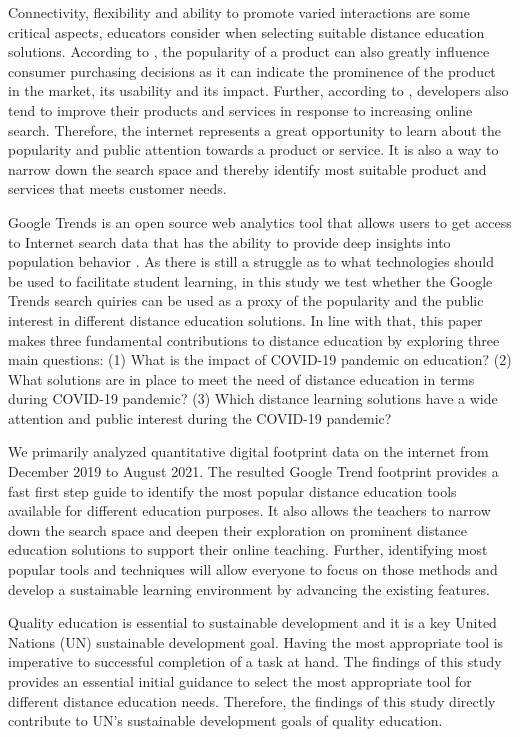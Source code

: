 \documentclass[11pt,a4paper,]{article}
\begin{document}
Connectivity, flexibility and ability to promote varied interactions are some critical aspects, educators consider when selecting suitable distance education solutions. According to \textcite{ahn2006utilizing}, the popularity of a product can also greatly influence consumer purchasing decisions as it can indicate the prominence of the product in the market, its usability and its impact. Further, according to \textcite{willis2020using}, developers also tend to improve their products and services in response to increasing online search. Therefore, the internet represents a great opportunity to learn about the popularity and public attention towards a product or service. It is also a way to narrow down the search space and thereby identify most suitable product and services that meets customer needs.

Google Trends is an open source web analytics tool that allows users to get access to Internet search data that has the ability to provide deep insights into population behavior \autocite{nuti2014use}. As there is still a struggle as to what technologies should be used to facilitate student learning, in this study we test whether the Google Trends search quiries can be used as a proxy of the popularity and the public interest in different distance education solutions. In line with that, this paper makes three fundamental contributions to distance education by exploring three main questions: (1) What is the impact of COVID-19 pandemic on education? (2) What solutions are in place to meet the need of distance education in terms during COVID-19 pandemic? (3) Which distance learning solutions have a wide attention and public interest during the COVID-19 pandemic?

We primarily analyzed quantitative digital footprint data on the internet from December 2019 to August 2021. The resulted Google Trend footprint provides a fast first step guide to identify the most popular distance education tools available for different education purposes. It also allows the teachers to narrow down the search space and deepen their exploration on prominent distance education solutions to support their online teaching. Further, identifying most popular tools and techniques will allow everyone to focus on those methods and develop a sustainable learning environment by advancing the existing features.

Quality education is essential to sustainable development and it is a key United Nations (UN) sustainable development goal. Having the most appropriate tool is imperative to successful completion of a task at hand. The findings of this study provides an essential initial guidance to select the most appropriate tool for different distance education needs. Therefore, the findings of this study directly contribute to UN's sustainable development goals of quality education.
\end{document}
